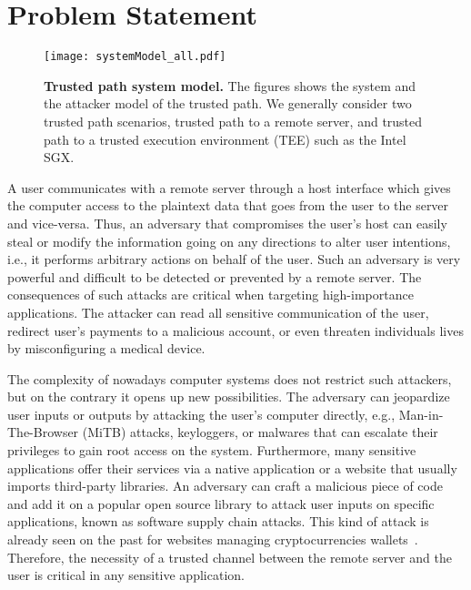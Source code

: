 \section{Problem Statement}
\label{sec:problemStatement}

\begin{figure}[t]
\centering
\texttt{[image: systemModel\_all.pdf]}
\caption{\textbf{Trusted path system model.} The figures shows the system and the attacker model of the trusted path. We generally consider two trusted path scenarios, \one trusted path to a remote server, and \two trusted path to a trusted execution environment (TEE) such as the Intel SGX.}
\label{fig:systemModel}
\centering
\end{figure}


\iffalse
A user communicates with a remote server through a host interface which gives %
the computer access to the plaintext data that goes from the user to the server and vice-versa. Thus, an adversary that compromises the user's host can easily steal or modify the information going on any directions to alter user intentions, i.e., it performs arbitrary actions on behalf of the user. Such an adversary is very powerful and difficult to be detected or prevented by a remote server. The consequences of such attacks are critical when targeting high-importance applications. The attacker can read all sensitive communication of the user, redirect user's payments to a malicious account, or even threaten individuals lives by misconfiguring a medical device. 

The complexity of nowadays computer systems does not restrict such attackers, but on the contrary it opens up new possibilities. The adversary can jeopardize user inputs or outputs by attacking the user's computer directly, e.g., Man-in-The-Browser (MiTB) attacks, keyloggers, or malwares that can escalate their privileges to gain root access on the system. Furthermore, many sensitive applications offer their services via a native application or a website that usually imports third-party libraries. An adversary can craft a malicious piece of code and add it on a popular open source library to attack user inputs on specific applications, known as software supply chain attacks. This kind of attack is already seen on the past for websites managing cryptocurrencies wallets~\cite{softSupplyChainAttack, jsSupplyChainAttack}. Therefore, the necessity of a trusted channel between the remote server and the user is critical in any sensitive application.

